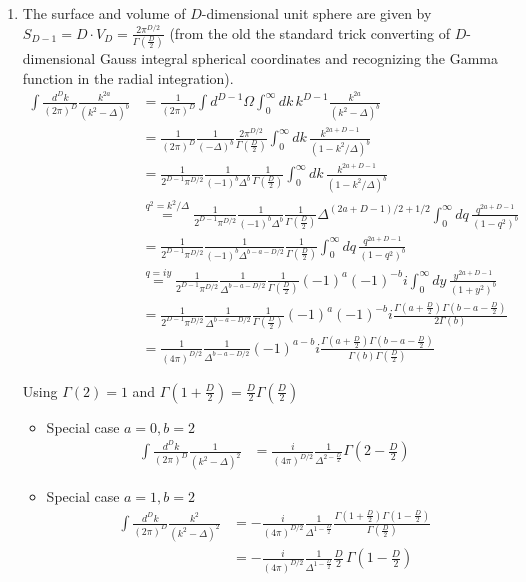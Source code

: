 \documentclass[10pt,a4paper]{article}
\theoremstyle{definition}
\begin{document}
\begin{enumerate}[1.]
\begin{enumerate}[1.)]
\item The surface and volume of $D$-dimensional unit sphere are given by $S_{D-1}=D\cdot V_D=\frac{2\pi^{D/2}}{\Gamma(\frac{D}{2})}$ (from the old the standard trick converting of $D$-dimensional Gauss integral spherical coordinates and recognizing the Gamma function in the radial integration).
\begin{align}
\int\frac{d^Dk}{(2\pi)^D}\frac{k^{2a}}{(k^2-\Delta)^b}
&=\frac{1}{(2\pi)^D} \int d^{D-1}\Omega \int_0^\infty dk\,k^{D-1}\frac{k^{2a}}{(k^2-\Delta)^b}\\
&=\frac{1}{(2\pi)^D} \frac{1}{(-\Delta)^b} \frac{2\pi^{D/2}}{\Gamma(\frac{D}{2})} \int_0^\infty dk\,\frac{k^{2a+D-1}}{(1-k^2/\Delta)^b}\\
&=\frac{1}{2^{D-1}\pi^{D/2}} \frac{1}{(-1)^b\Delta^b} \frac{1}{\Gamma(\frac{D}{2})} \int_0^\infty dk\,\frac{k^{2a+D-1}}{(1-k^2/\Delta)^b}\\
&\overset{q^2=k^2/\Delta }{=}\frac{1}{2^{D-1}\pi^{D/2}} \frac{1}{(-1)^b\Delta^b} \frac{1}{\Gamma(\frac{D}{2})} \Delta^{(2a+D-1)/2+1/2}\int_0^\infty dq\,\frac{q^{2a+D-1}}{(1-q^2)^b}\\
&=\frac{1}{2^{D-1}\pi^{D/2}} \frac{1}{(-1)^b\Delta^{b-a-D/2}} \frac{1}{\Gamma(\frac{D}{2})} \int_0^\infty dq\,\frac{q^{2a+D-1}}{(1-q^2)^b}\\
&\overset{q=iy}{=}\frac{1}{2^{D-1}\pi^{D/2}} \frac{1}{\Delta^{b-a-D/2}} \frac{1}{\Gamma(\frac{D}{2})}(-1)^{a}(-1)^{-b}i \int_0^\infty dy\,\frac{y^{2a+D-1}}{(1+y^2)^b}\\
&=\frac{1}{2^{D-1}\pi^{D/2}} \frac{1}{\Delta^{b-a-D/2}} \frac{1}{\Gamma(\frac{D}{2})}(-1)^{a}(-1)^{-b}i \frac{\Gamma(a+\frac{D}{2})\Gamma(b-a-\frac{D}{2})}{2\Gamma(b)}\\
&=\frac{1}{(4\pi)^{D/2}} \frac{1}{\Delta^{b-a-D/2}}(-1)^{a-b}i \frac{\Gamma(a+\frac{D}{2})\Gamma(b-a-\frac{D}{2})}{\Gamma(b)\Gamma(\frac{D}{2})}
\end{align}



Using $\Gamma(2)=1$ and $\Gamma\left(1+\frac{D}{2}\right)=\frac{D}{2}\Gamma\left(\frac{D}{2}\right)$
\begin{itemize}
\item Special case $a=0, b=2$
\begin{align}
\int\frac{d^Dk}{(2\pi)^D}\frac{1}{(k^2-\Delta)^2}
&=\frac{i}{(4\pi)^{D/2}}\frac{1}{\Delta^{2-\frac{D}{2}}}\Gamma\left(2-\frac{D}{2}\right)
\end{align}

\item Special case $a=1, b=2$
\begin{align}
\int\frac{d^Dk}{(2\pi)^D}\frac{k^{2}}{(k^2-\Delta)^2}
&=-\frac{i}{(4\pi)^{D/2}}\frac{1}{\Delta^{1-\frac{D}{2}}}\frac{\Gamma\left(1+\frac{D}{2}\right)\Gamma\left(1-\frac{D}{2}\right)}{\Gamma\left(\frac{D}{2}\right)}\\
&=-\frac{i}{(4\pi)^{D/2}}\frac{1}{\Delta^{1-\frac{D}{2}}}\frac{D}{2}\,\Gamma\left(1-\frac{D}{2}\right)
\end{align}


\end{itemize}
\end{enumerate}
\end{enumerate}
\end{document}
